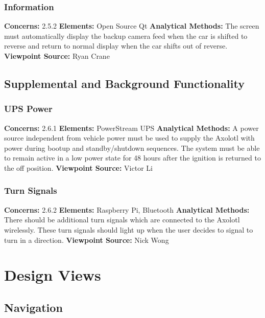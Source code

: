 \documentclass[onecolumn, draftclsnofoot,10pt, compsoc]{IEEEtran}
\begin{document}
\subsubsection{Information}
\textbf{Concerns:} 2.5.2 \newline
\textbf{Elements:} Open Source Qt \newline
\textbf{Analytical Methods:} The screen must automatically display the backup camera feed when the car is shifted to reverse and return to normal display when the car shifts out of reverse.  \newline
\textbf{Viewpoint Source:} Ryan Crane

\subsection{Supplemental and Background Functionality}
\subsubsection{UPS Power}
\textbf{Concerns:} 2.6.1 \newline
\textbf{Elements:} PowerStream UPS \newline
\textbf{Analytical Methods:} A power source independent from vehicle power must be used to supply the Axolotl with power during bootup and standby/shutdown sequences. The system must be able to remain active in a low power state for 48 hours after the ignition is returned to the off position. \newline
\textbf{Viewpoint Source:} Victor Li

\subsubsection{Turn Signals}
\textbf{Concerns:} 2.6.2 \newline
\textbf{Elements:} Raspberry Pi, Bluetooth \newline
\textbf{Analytical Methods:} There should be additional turn signals which are connected to the Axolotl wirelessly. These turn signals should light up when the user decides to signal to turn in a direction.  \newline
\textbf{Viewpoint Source:} Nick Wong

\newpage
\section{Design Views}
\subsection{Navigation}
\end{document}
